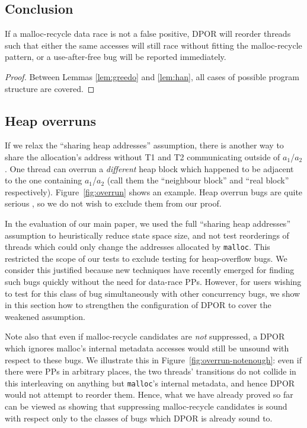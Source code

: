 \subsection{Conclusion}

\setcounter{theorem}{2}
\begin{theorem}
	\label{thm:recycle}
	If a malloc-recycle data race is not a false positive, DPOR will reorder threads such that either the same accesses will still race without fitting the malloc-recycle pattern, or a use-after-free bug will be reported immediately.
\end{theorem}
\begin{proof}
	Between Lemmas \ref{lem:greedo} and \ref{lem:han}, all cases of possible program structure are covered.
\end{proof}


\subsection{Heap overruns}
\label{sec:owned}

If we relax the ``sharing heap addresses'' assumption, there is another way to share the allocation's address without T1 and T2 communicating outside of $a_1$/$a_2$. One thread can overrun a {\em different} heap block which happened to be adjacent to the one containing $a_1$/$a_2$ (call them the ``neighbour block'' and ``real block'' respectively).
Figure~\ref{fig:overrun} shows an example.
Heap overrun bugs are quite serious \cite{eternal-war}, so we do not wish to exclude them from our proof.

In the evaluation of our main paper, we used the full ``sharing heap addresses'' assumption to heuristically reduce state space size,
and not test reorderings of threads which could only change the addresses allocated by {\tt malloc}.
This restricted the scope of our tests to exclude testing for heap-overflow bugs.
We consider this justified because new techniques \cite{sparc-ssm} have recently emerged for finding such bugs quickly without the need for data-race PPs.
However, for users wishing to test for this class of bug simultaneously with other concurrency bugs, we show in this section how to strengthen the configuration of DPOR to cover the weakened assumption.

Note also that even if malloc-recycle candidates are {\em not} suppressed,
a DPOR which ignores malloc's internal metadata accesses would still be unsound with respect to these bugs.
We illustrate this in Figure~\ref{fig:overrun-notenough}: even if there were PPs in arbitrary places, the two threads' transitions do not collide in this interleaving on anything but {\tt malloc}'s internal metadata, and hence DPOR would not attempt to reorder them.
Hence, what we have already proved so far can be viewed as showing that suppressing malloc-recycle candidates is sound with respect only to the classes of bugs which DPOR is already sound to.

